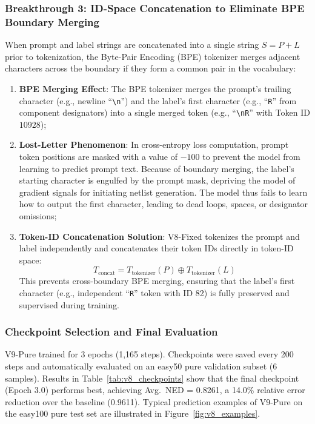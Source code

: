 \subsubsection{Breakthrough 3: ID-Space Concatenation to Eliminate BPE Boundary Merging}
When prompt and label strings are concatenated into a single string $S = P + L$ prior to tokenization, the Byte-Pair Encoding (BPE) tokenizer merges adjacent characters across the boundary if they form a common pair in the vocabulary:
\begin{enumerate}[nosep]
    \item \textbf{BPE Merging Effect}: The BPE tokenizer merges the prompt's trailing character (e.g., newline ``\texttt{\textbackslash n}'') and the label's first character (e.g., ``\texttt{R}'' from component designators) into a single merged token (e.g., ``\texttt{\textbackslash nR}'' with Token ID $10928$);
    \item \textbf{Lost-Letter Phenomenon}: In cross-entropy loss computation, prompt token positions are masked with a value of $-100$ to prevent the model from learning to predict prompt text. Because of boundary merging, the label's starting character is engulfed by the prompt mask, depriving the model of gradient signals for initiating netlist generation. The model thus fails to learn how to output the first character, leading to dead loops, spaces, or designator omissions;
    \item \textbf{Token-ID Concatenation Solution}: V8-Fixed tokenizes the prompt and label independently and concatenates their token IDs directly in token-ID space:
    \begin{equation}
    T_{\text{concat}} = T_{\text{tokenizer}}(P) \oplus T_{\text{tokenizer}}(L)
    \end{equation}
    This prevents cross-boundary BPE merging, ensuring that the label's first character (e.g., independent ``\texttt{R}'' token with ID 82) is fully preserved and supervised during training.
\end{enumerate}

\subsubsection{Checkpoint Selection and Final Evaluation}

V9-Pure trained for 3 epochs (1,165 steps). Checkpoints were saved every 200 steps and automatically evaluated on an easy50 pure validation subset (6 samples). Results in Table~\ref{tab:v8_checkpoints} show that the final checkpoint (Epoch 3.0) performs best, achieving Avg.\ NED = 0.8261, a 14.0\% relative error reduction over the baseline (0.9611). Typical prediction examples of V9-Pure on the easy100 pure test set are illustrated in Figure~\ref{fig:v8_examples}.

